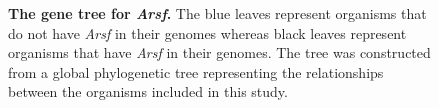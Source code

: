 \documentclass{article}
\begin{document}
\begin{figure}[]
\centering
{}
\caption{\textbf{The gene tree for \textit{Arsf}.} The blue leaves represent organisms that do not have \textit{Arsf} in their genomes whereas black leaves represent organisms that have \textit{Arsf} in their genomes. The tree was constructed from a global phylogenetic tree representing the relationships between the organisms included in this study.}
\label{fig_3}
\end{figure}
\end{document}
